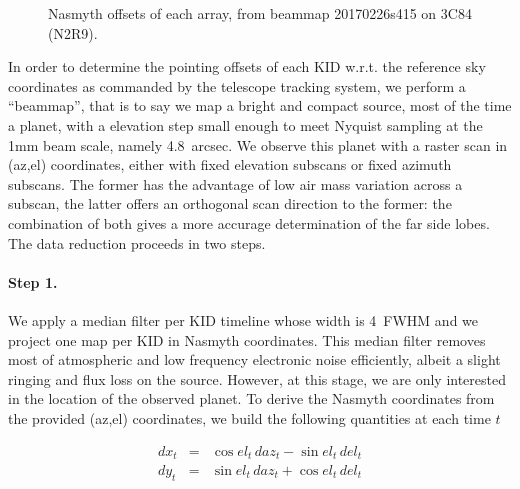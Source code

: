 \begin{figure}[p]
\begin{center}
\caption{Nasmyth offsets of each array, from beammap 20170226s415 on
  3C84 (N2R9).}
\label{fig:fov_ex}
\end{center}
\end{figure}


In order to determine the pointing offsets of each KID w.r.t. the reference sky
coordinates as commanded by the telescope tracking system, we perform a
``beammap'', that is to say we map a bright and compact source, most of the time
a planet, with a elevation step small enough to meet Nyquist sampling at the 1mm
beam scale, namely 4.8~arcsec. We observe this planet with a raster scan in
(az,el) coordinates, either with fixed elevation subscans or fixed azimuth
subscans. The former has the advantage of low air mass variation across a
subscan, the latter offers an orthogonal scan direction to the former: the
combination of both gives a more accurage determination of the far side
lobes. The data reduction proceeds in two steps.

\paragraph{Step 1.} We apply a median filter per
KID timeline whose width is 4~FWHM and we project one map per KID in Nasmyth
coordinates. This median filter removes most of atmospheric and low frequency
electronic noise efficiently, albeit a slight ringing and flux loss on the
source. However, at this stage, we are only interested in the location of the
observed planet. To derive the Nasmyth coordinates from the provided (az,el)
coordinates, we build the following quantities at each time $t$

\begin{eqnarray}
dx_t &=& \cos el_t\, daz_t - \sin el_t\, del_t \nonumber \\
dy_t &=& \sin el_t\, daz_t + \cos el_t\, del_t \nonumber
\end{eqnarray}

